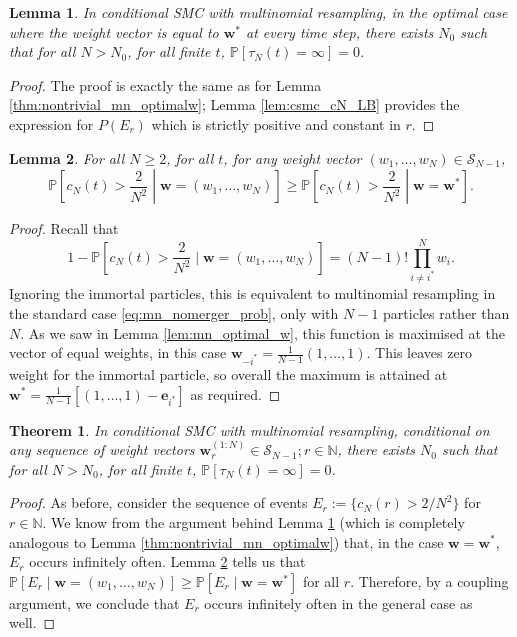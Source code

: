 \documentclass{article}
\newtheorem{thm}{Theorem}
\newtheorem{lemma}{Lemma}
\newcommand{\PR}{\mathbb{P}}
\begin{document}
 
\begin{lemma}\label{thm:nontrivial_csmc_optimalw}
In conditional SMC with multinomial resampling, in the optimal case where the weight vector is equal to $\mathbf{w}^*$ at every time step, there exists $N_0$ such that for all $N>N_0$, for all finite $t$, $\PR[\tau_N(t) = \infty] =0$.
\end{lemma}

\begin{proof}
The proof is exactly the same as for Lemma \ref{thm:nontrivial_mn_optimalw}; Lemma \ref{lem:csmc_cN_LB} provides the expression for $P(E_r)$ which is strictly positive and constant in $r$.
\end{proof}


\begin{lemma}\label{lem:csmc_optimal_w}
For all $N\geq 2$, for all $t$, for any weight vector $(w_1, \dots, w_N) \in \mathcal{S}_{N-1}$,
\begin{equation*}
\PR \left[c_N(t) > \frac{2}{N^2} \middle| \mathbf{w}=(w_1, \dots, w_N) \right]
\geq \PR \left[c_N(t) > \frac{2}{N^2} \middle| \mathbf{w}=\mathbf{w}^* \right].
\end{equation*}
\end{lemma}

\begin{proof}
Recall that
\begin{equation*}
1- \PR \left[c_N(t) > \frac{2}{N^2} \mid \mathbf{w}=(w_1, \dots, w_N) \right]
= (N-1)! \prod_{i\neq i^*}^{N} w_i .
\end{equation*}
Ignoring the immortal particles, this is equivalent to multinomial resampling in the standard case \eqref{eq:mn_nomerger_prob}, only with $N-1$ particles rather than $N$. 
As we saw in Lemma \ref{lem:mn_optimal_w}, this function is maximised at the vector of equal weights, in this case $\mathbf{w}_{-i^*}=\frac{1}{N-1} (1,\dots,1)$. 
This leaves zero weight for the immortal particle, so overall the maximum is attained at $\mathbf{w}^*=\frac{1}{N-1} \left[ (1,\dots,1) - \mathbf{e}_{i^*} \right]$ as required.
\end{proof}


\begin{thm}
In conditional SMC with multinomial resampling, conditional on any sequence of weight vectors $\mathbf{w}_r^{(1:N)} \in \mathcal{S}_{N-1}; r\in\mathbb{N}$, there exists $N_0$ such that for all $N>N_0$, for all finite $t$, $\PR[\tau_N(t) = \infty] =0$.
\end{thm}

\begin{proof}
As before, consider the sequence of events 
$E_r := \{ c_N(r) > 2/N^2 \}$ for $r \in \mathbb{N}$.
We know from the argument behind Lemma \ref{thm:nontrivial_csmc_optimalw} (which is completely analogous to Lemma \ref{thm:nontrivial_mn_optimalw}) that, in the case $\mathbf{w}=\mathbf{w}^*$, $E_r$ occurs infinitely often. Lemma \ref{lem:csmc_optimal_w} tells us that 
$\PR[E_r \mid \mathbf{w}=(w_1, \dots, w_N)] \geq \PR[E_r \mid \mathbf{w}=\mathbf{w}^*]$
for all $r$. 
Therefore, by a coupling argument, we conclude that $E_r$ occurs infinitely often in the general case as well.
\end{proof}
\end{document}
